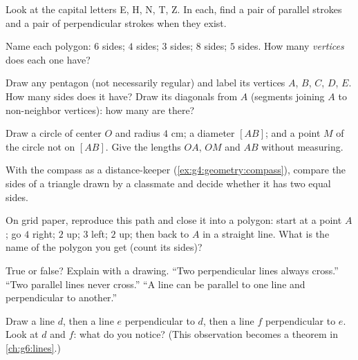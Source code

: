 \begin{exercise}[$\star$]\label{exo:g4:geometry:2}
Look at the capital letters E, H, N, T, Z. In each, find a pair of
parallel strokes and a pair of perpendicular strokes when they
exist.
\end{exercise}

\begin{exercise}[$\star$]\label{exo:g4:geometry:3}
Name each polygon: $6$ sides; $4$ sides; $3$ sides; $8$ sides;
$5$ sides. How many \emph{vertices} does each one have?
\end{exercise}

\begin{exercise}[$\star$]\label{exo:g4:geometry:4}
Draw any pentagon (not necessarily regular) and label its vertices
$A$, $B$, $C$, $D$, $E$. How many sides does it have? Draw its
diagonals from $A$ (segments joining $A$ to non-neighbor vertices):
how many are there?
\end{exercise}

\begin{exercise}[$\star$]\label{exo:g4:geometry:5}
Draw a circle of center $O$ and radius $4$ cm; a diameter $[AB]$;
and a point $M$ of the circle not on $[AB]$. Give the lengths $OA$,
$OM$ and $AB$ without measuring.
\end{exercise}

\begin{exercise}[$\star$]\label{exo:g4:geometry:6}
With the compass as a distance-keeper
(\cref{ex:g4:geometry:compass}), compare the sides of a triangle
drawn by a classmate and decide whether it has two equal sides.
\end{exercise}

\begin{exercise}[$\star$]\label{exo:g4:geometry:7}
On grid paper, reproduce this path and close it into a polygon:
start at a point $A$; go $4$ right; $2$ up; $3$ left; $2$ up;
then back to $A$ in a straight line. What is the name of the polygon
you get (count its sides)?
\end{exercise}

\begin{exercise}[$\star$]\label{exo:g4:geometry:8}
True or false? Explain with a drawing.
``Two perpendicular lines always cross.''
``Two parallel lines never cross.''
``A line can be parallel to one line and perpendicular to
another.''
\end{exercise}

\begin{exercise}[$\star\star$]\label{exo:g4:geometry:9}
Draw a line $d$, then a line $e$ perpendicular to $d$, then a line
$f$ perpendicular to $e$. Look at $d$ and $f$: what do you notice?
(This observation becomes a theorem in \cref{ch:g6:lines}.)
\end{exercise}

